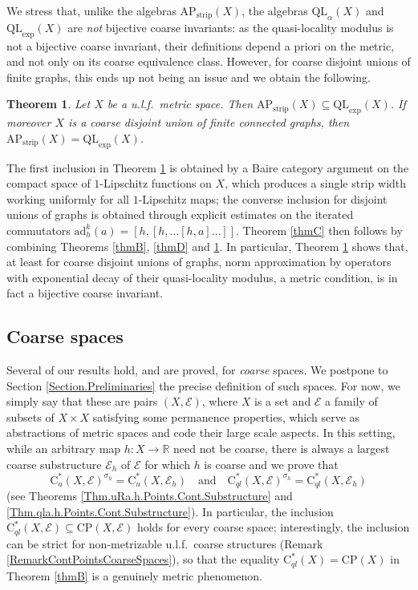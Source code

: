 \documentclass[11pt]{amsart}
\newcommand{\cE}{\mathcal{E}}
\numberwithin{equation}{section}
\newtheorem{theoremi}{Theorem}
\theoremstyle{definition}
\theoremstyle{remark}
\begin{document}
We stress that, unlike the algebras $\mathrm{AP}_{\mathrm{strip}}(X)$, the
algebras $\mathrm{QL}_\alpha(X)$ and $\mathrm{QL}_{\exp}(X)$ are \emph{not} bijective 
coarse invariants: as the quasi-locality  modulus is not a bijective coarse invariant,  their definitions depend a priori on the metric, and not only on its
coarse equivalence class. However, for coarse disjoint unions of finite graphs, this ends up not being an issue and we obtain the following.

\begin{theoremi}\label{thmE}
Let $X$ be a u.l.f.\ metric space. Then
$\mathrm{AP}_{\mathrm{strip}}(X)\subseteq \mathrm{QL}_{\exp}(X)$. If moreover
$X$ is a coarse disjoint union of finite connected graphs, then
$\mathrm{AP}_{\mathrm{strip}}(X)= \mathrm{QL}_{\exp}(X)$.
\end{theoremi}

The first inclusion in Theorem \ref{thmE} is obtained by a Baire category argument on the compact space
of $1$-Lipschitz functions on $X$, which produces a single strip width working
uniformly for all $1$-Lipschitz maps; the converse inclusion for disjoint unions of
graphs is obtained through explicit estimates on the iterated commutators
$\mathrm{ad}_h^k(a)=[h,[h,\dots[h,a]\dots]]$. Theorem \ref{thmC} then follows by
combining Theorems \ref{thmB}, \ref{thmD} and \ref{thmE}. In particular,
Theorem \ref{thmE} shows that, at least for coarse disjoint unions of graphs, norm approximation by operators with 
exponential decay of their quasi-locality modulus, a metric condition, is in fact
a bijective  coarse invariant.

\subsection{Coarse spaces}
Several of our results hold, and are proved, for \emph{coarse} spaces. We postpone to Section \ref{Section.Preliminaries} the precise definition of such spaces. For now, we simply say  that these are pairs $(X,\cE)$, where $X$ is a set and $\cE$ a family of subsets of $X\times X$ satisfying some permanence properties, which serve as abstractions of metric spaces and code their large scale aspects.   In this setting, while an arbitrary map
$h\colon X\to\mathbb{R}$ need not be coarse, there is always a largest coarse substructure $\cE_h$ of $\cE$ for which $h$ is coarse 
and we prove that
\[
\mathrm{C}^*_u(X,\mathcal{E})^{\sigma_h}=\mathrm{C}^*_u(X,\mathcal{E}_h)
\quad\text{and}\quad
\mathrm{C}^*_{ql}(X,\mathcal{E})^{\sigma_h}=\mathrm{C}^*_{ql}(X,\mathcal{E}_h)
\]
(see Theorems \ref{Thm.uRa.h.Points.Cont.Substructure} and \ref{Thm.qla.h.Points.Cont.Substructure}). In particular, the inclusion
$\mathrm{C}^*_{ql}(X,\mathcal{E})\subseteq \mathrm{CP}(X,\mathcal{E})$ holds for
every coarse space; interestingly, the inclusion can be strict for
non-metrizable u.l.f.\ coarse structures (Remark \ref{RemarkContPointsCoarseSpaces}), so that the
equality $\mathrm{C}^*_{ql}(X)=\mathrm{CP}(X)$ in Theorem \ref{thmB} is a
genuinely metric phenomenon.
 
\end{document}
